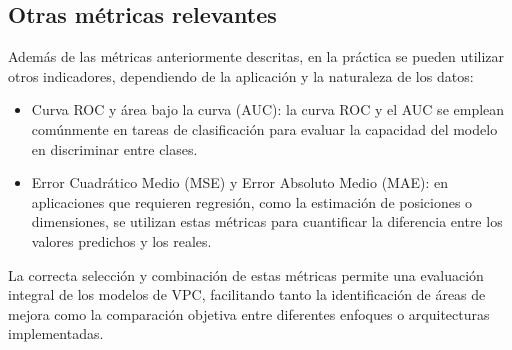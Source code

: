 \subsection{Otras métricas relevantes}

Además de las métricas anteriormente descritas, en la práctica se pueden utilizar otros indicadores, dependiendo de la aplicación y la naturaleza de los datos: \begin{itemize}
	\item Curva ROC y área bajo la curva (AUC): la curva ROC y el AUC se emplean comúnmente en tareas de clasificación para evaluar la capacidad del modelo en discriminar entre clases.
	\item Error Cuadrático Medio (MSE) y Error Absoluto Medio (MAE): en aplicaciones que requieren regresión, como la estimación de posiciones o dimensiones, se utilizan estas métricas para cuantificar la diferencia entre los valores predichos y los reales.
\end{itemize}

La correcta selección y combinación de estas métricas permite una evaluación integral de los modelos de VPC, facilitando tanto la identificación de áreas de mejora como la comparación objetiva entre diferentes enfoques o arquitecturas implementadas.